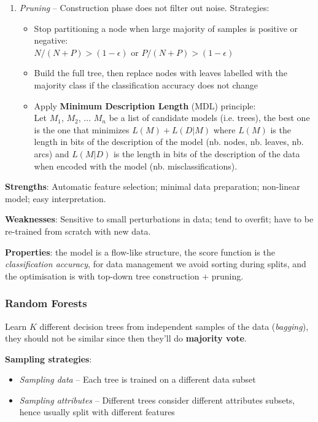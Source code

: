 \begin{enumerate}
      \item \emph{Pruning} -- Construction phase does not filter out noise. Strategies:
      \begin{itemize}
        \item Stop partitioning a node when large majority of samples is positive or negative:\\
        $N/(N+P)>(1-\epsilon)$ or $P/(N+P)>(1-\epsilon)$
        \item Build the full tree, then replace nodes with leaves labelled with the majority class if the classification accuracy does not change
        \item Apply \textbf{Minimum Description Length} (MDL) principle:\\
        Let $M_1$, $M_2$, ... $M_n$ be a list of candidate models (i.e. trees), the best one is the one that minimizes $L(M)+L(D|M)$ where $L(M)$ is the length in bits of the description of the model (nb. nodes, nb. leaves, nb. arcs) and $L(M|D)$ is the length in bits of the description of the data when encoded with the model (nb. misclassifications).
      \end{itemize}
    \end{enumerate}

    \textbf{Strengths}: Automatic feature selection; minimal data preparation; non-linear model; easy interpretation.

    \textbf{Weaknesses}: Sensitive to small perturbations in data; tend to overfit; have to be re-trained from scratch with new data.

    \textbf{Properties}: the model is a flow-like structure, the score function is the \emph{classification accuracy}, for data management we avoid sorting during splits, and the optimisation is with top-down tree construction + pruning.
  \subsubsection{Random Forests} %
  \label{ssub:random_forests}
    Learn $K$ different decision trees from independent samples of the data (\emph{bagging}), they should not be similar since then they'll do \textbf{majority vote}.

    \textbf{Sampling strategies}:
    \begin{itemize}
      \item \emph{Sampling data} -- Each tree is trained on a different data subset
      \item \emph{Sampling attributes} -- Different trees consider different attributes subsets, hence usually split with different features
    \end{itemize}

